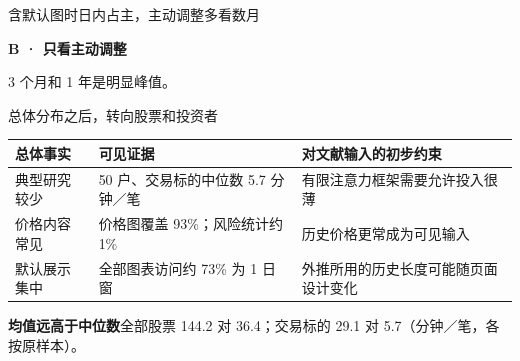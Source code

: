 \begin{frame}[label=windows]{含默认图时日内占主，主动调整多看数月}
  {\small\textbf{B · 只看主动调整}\par
    \par
    {\small 3 个月和 1 年是明显峰值。}}
\end{frame}

\begin{frame}[label=averages]{总体分布之后，转向股票和投资者}
  \small
  \begin{tabularx}{\linewidth}{@{}L{.21\linewidth}Y Y@{}}
    \toprule 总体事实 & 可见证据 & 对文献输入的初步约束\\\midrule
    典型研究较少 & 50 户、交易标的中位数 5.7 分钟／笔 & 有限注意力框架需要允许投入很薄\\
    价格内容常见 & 价格图覆盖 93\%；风险统计约 1\% & 历史价格更常成为可见输入\\
    默认展示集中 & 全部图表访问约 73\% 为 1 日窗 & 外推所用的历史长度可能随页面设计变化\\
    \bottomrule
  \end{tabularx}
  \medskip
  {\small\textbf{均值远高于中位数}\quad 全部股票 144.2 对 36.4；交易标的 29.1 对 5.7（分钟／笔，各按原样本）。}
\end{frame}
